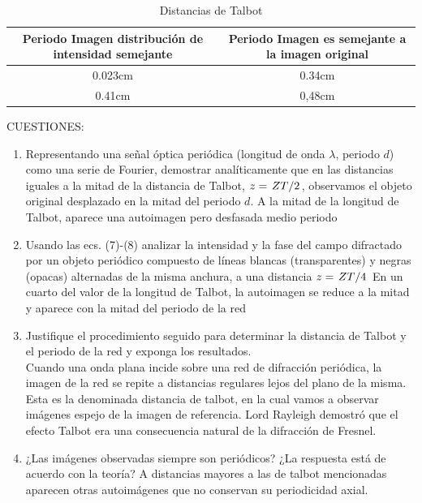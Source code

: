 \documentclass{./packages/optica-article}
\begin{document}
\begin{table}[h] %
        \centering
        \begin{tabular}{|c|c|}
            \hline
            Periodo Imagen distribución de intensidad semejante & Periodo Imagen es semejante a la imagen original\\
            \hline
            0.023cm & 0.34cm\\
            \hline
            0.41cm & 0,48cm \\
            \hline
        \end{tabular}
        \caption{Distancias de Talbot}
        \label{tab:dtalbot}
    \end{table}

CUESTIONES:
\begin{enumerate}
\item Representando una señal óptica periódica (longitud de onda $\lambda$, periodo $d$) como una serie de Fourier, demostrar analíticamente que en las distancias iguales a la mitad de la distancia de Talbot, $z=\flatfrac{ZT}{2}$, observamos el objeto original desplazado en la mitad del periodo $d$.
A la mitad de la longitud de Talbot, aparece una autoimagen pero desfasada medio periodo
\item Usando las ecs. (7)-(8) analizar la intensidad y la fase del campo difractado por un objeto periódico compuesto de líneas blancas (transparentes) y negras (opacas) alternadas de la misma anchura, a una distancia $z=\flatfrac{ZT}{4}$
En un cuarto del valor de la longitud de Talbot, la autoimagen se reduce a la mitad y aparece con la mitad del periodo de la red
\item Justifique el procedimiento seguido para determinar la distancia de Talbot y el periodo de la red y exponga los resultados.\\
Cuando una onda plana incide sobre una red de difracción periódica, la imagen de la red se repite a distancias regulares lejos del plano de la misma. Esta es la denominada distancia de talbot, en la cual vamos a observar imágenes espejo de la imagen de referencia. Lord Rayleigh demostró que el efecto Talbot era una consecuencia natural de la difracción de Fresnel.
\item ¿Las imágenes observadas siempre son periódicos? ¿La respuesta está de acuerdo con la teoría?
A distancias mayores a las de talbot mencionadas aparecen otras autoimágenes que no conservan su periodicidad axial.
\end{enumerate}
\end{document}
